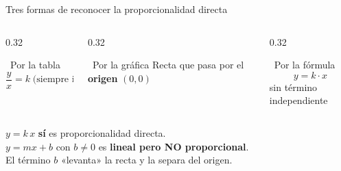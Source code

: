 \documentclass[aspectratio=169, 10pt, spanish]{beamer}
\begin{document}
\begin{frame}{Tres formas de reconocer la proporcionalidad directa}
  \begin{columns}[t]
    \begin{column}{0.32\textwidth}
      \begin{block}{\faTable\ Por la tabla}
        \[
          \frac{y}{x} = k \;\text{(siempre igual)}
        \]
      \end{block}
    \end{column}
    \begin{column}{0.32\textwidth}
      \begin{block}{\faChartLine\ Por la gráfica}
        Recta que pasa por el \textbf{origen} $(0,0)$
      \end{block}
    \end{column}
    \begin{column}{0.32\textwidth}
      \begin{block}{\faCalculator\ Por la fórmula}
        \[y = k \cdot x\]
        sin término independiente
      \end{block}
    \end{column}
  \end{columns}
  \vspace{0.5cm}
  \begin{errorbox}
    $y = k\,x$ \textbf{sí} es proporcionalidad directa.\\
    $y = mx + b$ con $b \neq 0$ es \textbf{lineal pero NO proporcional}.\\
    El término $b$ «levanta» la recta y la separa del origen.
  \end{errorbox}
\end{frame}
\end{document}

